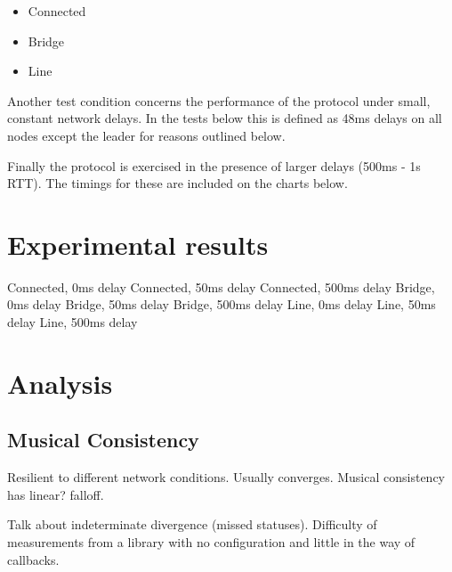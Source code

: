 \documentclass[11pt]{article} %
\theoremstyle{plain}
\theoremstyle{definition}
\begin{document}
\begin{itemize}
  \item Connected
  \item Bridge
  \item Line
\end{itemize}

Another test condition concerns the performance of the protocol under small,
constant network delays. In the tests below this is defined as 48ms delays on
all nodes except the leader for reasons outlined below.

Finally the protocol is exercised in the presence of larger delays (500ms - 1s
RTT). The timings for these are included on the charts below.

\section{Experimental results}

Connected, 0ms delay
Connected, 50ms delay
Connected, 500ms delay
Bridge, 0ms delay
Bridge, 50ms delay
Bridge, 500ms delay
Line, 0ms delay
Line, 50ms delay
Line, 500ms delay











\section{Analysis}

\subsection{Musical Consistency}

Resilient to different network conditions. Usually converges. Musical consistency has linear? falloff.

Talk about indeterminate divergence (missed statuses). Difficulty of measurements from a library with no configuration and little in the way of callbacks.
\end{document}
